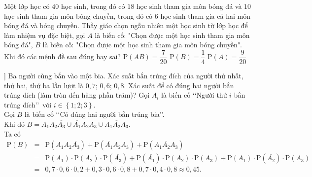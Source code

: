 \begin{ex}%
	Một lớp học có $40$ học sinh, trong đó có $18$ học sinh tham gia môn bóng đá và $10$ học sinh tham gia môn bóng chuyền, trong đó có $6$ học sinh tham gia cả hai môn bóng đá và bóng chuyền. Thầy giáo chọn ngẫu nhiên một học sinh từ lớp học để làm nhiệm vụ đặc biệt, gọi $A$ là biến cố: "Chọn được một học sinh tham gia môn bóng đá", $B$ là biến cố: "Chọn được một học sinh tham gia môn bóng chuyền". Khi đó các mệnh đề sau đúng hay sai?
	{$\mathrm{P}(AB)=\dfrac{7}{20}$}
	{\True $\mathrm{P}(B)=\dfrac{1}{4}$}
	{\True $\mathrm{P}(A)=\dfrac{9}{20}$}
\end{ex}

\begin{bt}%
]%
Ba người cùng bắn vào một bia. Xác suất bắn trúng đích của người thứ nhất, thứ hai, thứ ba lần lượt là $0,7$; $0,6$; $0,8$. Xác suất để có đúng hai người bắn trúng đích (làm tròn đến hàng phần trăm)?
\loigiai
{
Gọi $A_i$ là biến cố \lq\lq Người thứ $i$ bắn trúng đích\rq\rq\, với $i \in \left\{1;2;3\right\}$.\\
Gọi $B$ là biến cố \lq\lq Có đúng hai người bắn trúng bia\rq\rq.\\
Khi đó $B=A_1A_2\overline{A_3}\cup \overline{A_1}A_2A_3\cup A_1\overline{A_2}A_3$.\\
Ta có 
\begin{eqnarray*}
\mathrm{P} \left(B \right) &=& \mathrm{P} \left(A_1A_2\overline{A_3} \right)+\mathrm{P} \left(\overline{A_1}A_2A_3 \right)+\mathrm{P} \left(A_1\overline{A_2}A_3 \right) \\ 
& = & \mathrm{P} \left(A_1 \right) \cdot \mathrm{P} \left(A_2 \right)\cdot \mathrm{P} \left(\overline{A_3} \right)+\mathrm{P} \left(\overline{A_1} \right)\cdot \mathrm{P} \left(A_2 \right)\cdot \mathrm{P} \left(A_3 \right)+\mathrm{P} \left(A_1 \right)\cdot \mathrm{P} \left(\overline{A_2} \right) \cdot \mathrm{P} \left(A_3 \right) \\ 
& = & 0,7 \cdot 0,6 \cdot 0,2+0,3 \cdot 0,6 \cdot 0,8+0,7 \cdot 0,4 \cdot 0,8 \approx 0,45.
\end{eqnarray*}
}
\end{bt}

